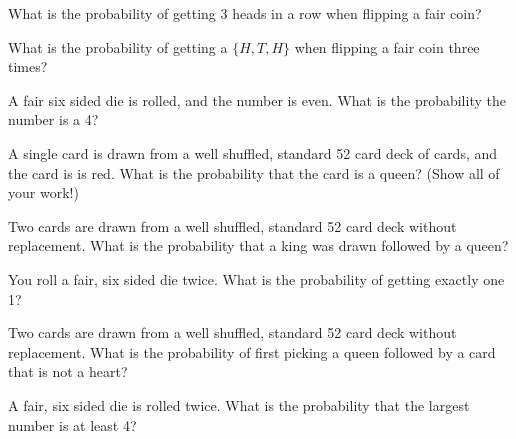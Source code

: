 \begin{problem}
\begin{subproblem}
    \vfill

    \clearpage

  \item What is the probability of getting 3 heads in a row when
    flipping a fair coin?

    \vfill

  \item What is the probability of getting a $\{H,T,H\}$ when flipping
    a fair coin three times?

    \vfill

  \item A fair six sided die is rolled, and the number is even.  What
    is the probability the number is a 4?

    \vfill

  \item A single card is drawn from a well shuffled, standard 52 card
    deck of cards, and the card is is red.  What is the probability
    that the card is a queen? (Show all of your work!)

    \vfill

    \clearpage

  \item Two cards are drawn from a well shuffled, standard 52 card
    deck without replacement.  What is the probability that a king was
    drawn followed by a queen?

    \vfill

  \item You roll a fair, six sided die twice. What is the probability
    of getting exactly one 1?

    \vfill

  \item Two cards are drawn from a well shuffled, standard 52 card
    deck without replacement. What is the probability of first picking
    a queen followed by a card that is not a heart?

    \vfill

  \item A fair, six sided die is rolled twice.  What is the
    probability that the largest number is at least 4?

    \vfill

  \end{subproblem}

\end{problem}




